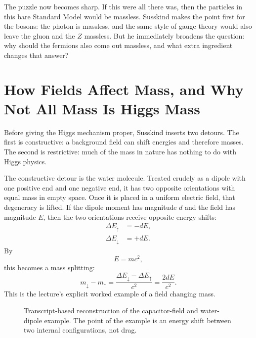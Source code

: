 The puzzle now becomes sharp. If this were all there was, then the particles in this bare Standard Model would be massless. Susskind makes the point first for the bosons: the photon is massless, and the same style of gauge theory would also leave the gluon and the \(Z\) massless. But he immediately broadens the question: why should the fermions also come out massless, and what extra ingredient changes that answer?

\section{How Fields Affect Mass, and Why Not All Mass Is Higgs Mass}

Before giving the Higgs mechanism proper, Susskind inserts two detours. The first is constructive: a background field can shift energies and therefore masses. The second is restrictive: much of the mass in nature has nothing to do with Higgs physics.

The constructive detour is the water molecule. Treated crudely as a dipole with one positive end and one negative end, it has two opposite orientations with equal mass in empty space. Once it is placed in a uniform electric field, that degeneracy is lifted. If the dipole moment has magnitude \(d\) and the field has magnitude \(E\), then the two orientations receive opposite energy shifts:
\begin{align}
\Delta E_{\uparrow} &= -dE,\\
\Delta E_{\downarrow} &= +dE.
\end{align}
By
\begin{equation}
E=mc^{2},
\end{equation}
this becomes a mass splitting:
\begin{equation}
m_{\downarrow}-m_{\uparrow}
=
\frac{\Delta E_{\downarrow}-\Delta E_{\uparrow}}{c^{2}}
=
\frac{2dE}{c^{2}}.
\end{equation}
This is the lecture's explicit worked example of a field changing mass.

\begin{figure}
\centering
{}
\caption{Transcript-based reconstruction of the capacitor-field and water-dipole example. The point of the example is an energy shift between two internal configurations, not drag.}
\end{figure}

